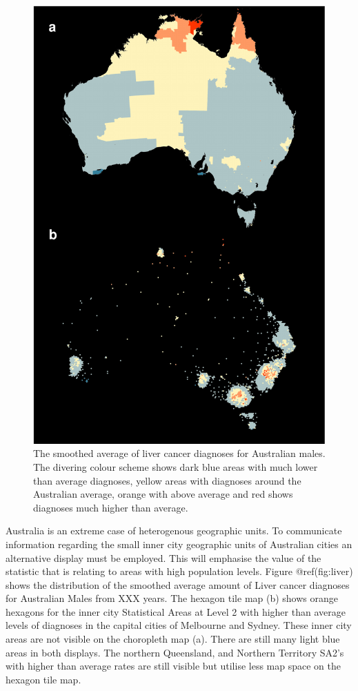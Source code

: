\documentclass[conference,final,]{IEEEtran}
\makeatletter
\def\maxwidth{\ifdim\Gin@nat@width>\linewidth\linewidth
\else\Gin@nat@width\fi}
\let\Oldincludegraphics\includegraphics
\renewcommand{\includegraphics}[1]{\Oldincludegraphics[width=\maxwidth]{#1}}
\makeatother
\begin{document}
\begin{figure}
\centering
\includegraphics{paper_files/figure-latex/liver-1.pdf}
\caption{The smoothed average of liver cancer diagnoses for Australian
males. The divering colour scheme shows dark blue areas with much lower
than average diagnoses, yellow areas with diagnoses around the
Australian average, orange with above average and red shows diagnoses
much higher than average.}
\end{figure}

Australia is an extreme case of heterogenous geographic units. To
communicate information regarding the small inner city geographic units
of Australian cities an alternative display must be employed. This will
emphasise the value of the statistic that is relating to areas with high
population levels. Figure @ref(fig:liver) shows the distribution of the
smoothed average amount of Liver cancer diagnoses for Australian Males
from XXX years. The hexagon tile map (b) shows orange hexagons for the
inner city Statistical Areas at Level 2 with higher than average levels
of diagnoses in the capital cities of Melbourne and Sydney. These inner
city areas are not visible on the choropleth map (a). There are still
many light blue areas in both displays. The northern Queensland, and
Northern Territory SA2's with higher than average rates are still
visible but utilise less map space on the hexagon tile map.
\end{document}
